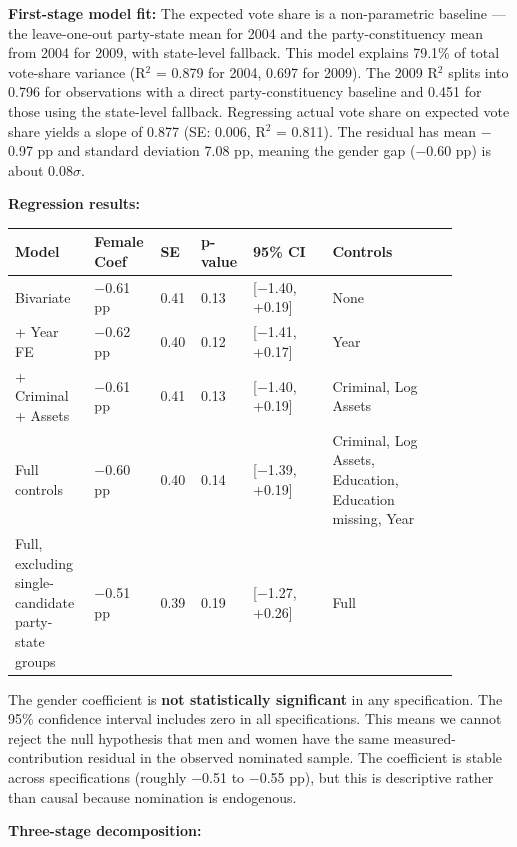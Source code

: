 \documentclass[
]{article}
\newcounter{none} %
\begin{document}
\textbf{First-stage model fit:} The expected vote share is a non-parametric baseline --- the leave-one-out party-state mean for 2004 and the party-constituency mean from 2004 for 2009, with state-level fallback. This model explains 79.1\% of total vote-share variance (R$^2$ = 0.879 for 2004, 0.697 for 2009). The 2009 R$^2$ splits into 0.796 for observations with a direct party-constituency baseline and 0.451 for those using the state-level fallback. Regressing actual vote share on expected vote share yields a slope of 0.877 (SE: 0.006, R$^2$ = 0.811). The residual has mean $-$0.97 pp and standard deviation 7.08 pp, meaning the gender gap ($-$0.60 pp) is about 0.08$\sigma$.

\textbf{Regression results:}

{\def\LTcaptype{none} %
\begin{longtable}[]{@{}p{0.17\linewidth}p{0.12\linewidth}p{0.07\linewidth}p{0.08\linewidth}p{0.17\linewidth}p{0.27\linewidth}@{}}
\toprule\noalign{}
Model & Female Coef & SE & p-value & 95\% CI & Controls \\
\midrule\noalign{}
\endhead
\bottomrule\noalign{}
\endlastfoot
Bivariate & $-$0.61 pp & 0.41 & 0.13 & {[}$-$1.40, +0.19{]} & None \\
+ Year FE & $-$0.62 pp & 0.40 & 0.12 & {[}$-$1.41, +0.17{]} & Year \\
+ Criminal + Assets & $-$0.61 pp & 0.41 & 0.13 & {[}$-$1.40, +0.19{]} & Criminal, Log Assets \\
Full controls & $-$0.60 pp & 0.40 & 0.14 & {[}$-$1.39, +0.19{]} & Criminal, Log Assets, Education, Education missing, Year \\
Full, excluding single-candidate party-state groups & $-$0.51 pp & 0.39 & 0.19 & {[}$-$1.27, +0.26{]} & Full \\
\end{longtable}
}

The gender coefficient is \textbf{not statistically significant} in any specification. The 95\% confidence interval includes zero in all specifications. This means we cannot reject the null hypothesis that men and women have the same measured-contribution residual in the observed nominated sample. The coefficient is stable across specifications (roughly $-$0.51 to $-$0.55 pp), but this is descriptive rather than causal because nomination is endogenous.

\textbf{Three-stage decomposition:}
\end{document}
